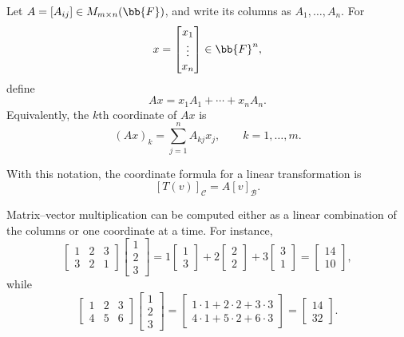 \begin{definition}
  Let $A=[A_{ij}]\in M_{m\times n}(\bb{F})$, and write its columns as
  $A_1,\ldots,A_n$. For
  \[
    x=\begin{bmatrix}x_1\\ \vdots\\ x_n\end{bmatrix}\in\bb{F}^n,
  \]
  define
  \[
    Ax=x_1A_1+\cdots+x_nA_n.
  \]
  Equivalently, the $k$th coordinate of $Ax$ is
  \[
    (Ax)_k=\sum_{j=1}^n A_{kj}x_j,
    \qquad k=1,\ldots,m.
  \]
\end{definition}

With this notation, the coordinate formula for a linear transformation is
\[
  [T(v)]_{\mathcal C}=A[v]_{\mathcal B}.
\]

\begin{example}
  Matrix--vector multiplication can be computed either as a linear
  combination of the columns or one coordinate at a time. For instance,
  \[
    \begin{bmatrix}
      1&2&3\\
      3&2&1
    \end{bmatrix}
    \begin{bmatrix}1\\2\\3\end{bmatrix}
    =1\begin{bmatrix}1\\3\end{bmatrix}
      +2\begin{bmatrix}2\\2\end{bmatrix}
      +3\begin{bmatrix}3\\1\end{bmatrix}
    =\begin{bmatrix}14\\10\end{bmatrix},
  \]
  while
  \[
    \begin{bmatrix}
      1&2&3\\
      4&5&6
    \end{bmatrix}
    \begin{bmatrix}1\\2\\3\end{bmatrix}
    =\begin{bmatrix}
      1\cdot1+2\cdot2+3\cdot3\\
      4\cdot1+5\cdot2+6\cdot3
    \end{bmatrix}
    =\begin{bmatrix}14\\32\end{bmatrix}.
  \]
\end{example}

